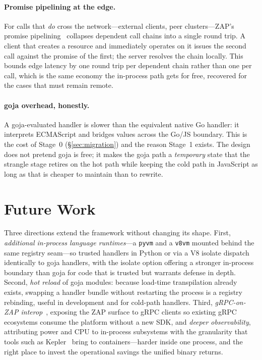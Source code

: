 \documentclass[11pt]{article}
\begin{document}
\paragraph{Promise pipelining at the edge.}
For calls that \emph{do} cross the network---external clients, peer
clusters---ZAP's promise pipelining~\cite{capnproto} collapses dependent
call chains into a single round trip. A client that creates a resource and
immediately operates on it issues the second call against the promise of
the first; the server resolves the chain locally. This bounds edge latency
by one round trip per dependent chain rather than one per call, which is
the same economy the in-process path gets for free, recovered for the cases
that must remain remote.

\paragraph{goja overhead, honestly.}
A goja-evaluated handler is slower than the equivalent native Go handler:
it interprets ECMAScript and bridges values across the Go/JS boundary. This
is the cost of Stage~0 (\S\ref{sec:migration}) and the reason Stage~1
exists. The design does not pretend goja is free; it makes the goja path a
\emph{temporary} state that the strangle stage retires on the hot path
while keeping the cold path in JavaScript as long as that is cheaper to
maintain than to rewrite.

\section{Future Work}
\label{sec:future}

Three directions extend the framework without changing its shape. First,
\emph{additional in-process language runtimes}---a \texttt{pyvm} and a
\texttt{v8vm} mounted behind the same registry seam---so trusted handlers
in Python or via a V8 isolate dispatch identically to goja handlers, with
the isolate option offering a stronger in-process boundary than goja for
code that is trusted but warrants defense in depth. Second,
\emph{hot reload} of goja modules: because load-time transpilation already
exists, swapping a handler bundle without restarting the process is a
registry rebinding, useful in development and for cold-path handlers.
Third, \emph{gRPC-on-ZAP interop}~\cite{grpc}, exposing the ZAP surface to
gRPC clients so existing gRPC ecosystems consume the platform without a new
SDK, and \emph{deeper observability}, attributing power and CPU to
in-process subsystems with the granularity that tools such as
Kepler~\cite{kepler} bring to containers---harder inside one process,
and the right place to invest the operational savings the unified binary
returns.
\end{document}
